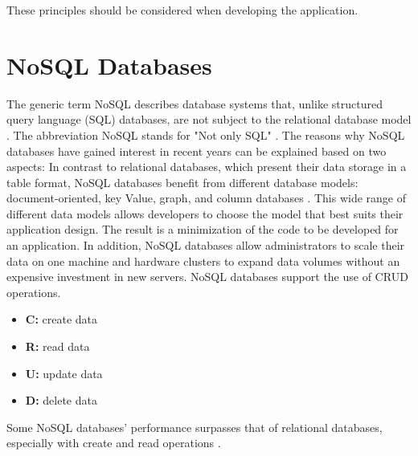 These principles should be considered when developing the application.

\section{NoSQL Databases}
The generic term NoSQL describes database systems that, unlike structured query language (SQL) databases, are not subject to the relational database model \cite{.mongonosql}. The abbreviation NoSQL stands for "Not only SQL" \cite{.mongonosql}. The reasons why NoSQL databases have gained interest in recent years can be explained based on two aspects: In contrast to relational databases, which present their data storage in a table format, NoSQL databases benefit from different database models: document-oriented, key Value, graph, and column databases \cite{.mongonosql}. This wide range of different data models allows developers to choose the model that best suits their application design. The result is a minimization of the code to be developed for an application. In addition, NoSQL databases allow administrators to scale their data on one machine and hardware clusters to expand data volumes without an expensive investment in new servers. NoSQL databases support the use of CRUD operations.
\begin{itemize}
	\item \textbf{C:} create data
	\item \textbf{R:} read data
	\item \textbf{U:} update data
	\item \textbf{D:} delete data
\end{itemize}
Some NoSQL databases' performance surpasses that of relational databases, especially with create and read operations \cite{.crud}.
